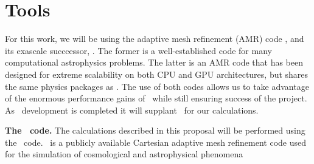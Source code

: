 \vspace{-4mm}
\section{Tools}
\label{sec:codes}
\vspace{-3mm}

 

For this work, we will be using the adaptive mesh refinement (AMR) code \enzo,
and its exascale succcessor, \enzoe.
The former is a well-established code for many computational astrophysics
problems.  The latter is an AMR code that has been designed for extreme scalability on both CPU
and GPU architectures, but shares the same physics packages as \enzo.  The use
of both codes allows us to take advantage of the enormous performance gains of
\enzoe\ while still ensuring success of the project.  As \enzoe\ development is
completed it will supplant \enzo\ for our calculations.

\noindent
{\large \textbf{The \enzo\ code.}}
The calculations described in this proposal will be performed using
the \enzo\ code.  \enzo\ is a publicly available Cartesian adaptive
mesh 
refinement code used for the simulation of cosmological and
astrophysical phenomena

